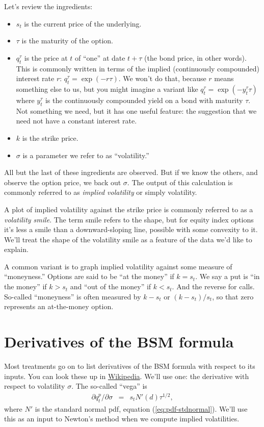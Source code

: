 \documentclass[11pt]{article}
\begin{document}
Let's review the ingredients:
\begin{itemize}
\item $s_t$ is the current price of the underlying.
\item $\tau$ is the maturity of the option.
\item $q_t^\tau$ is the price at $t$ of ``one'' at date $t+\tau$  (the bond price, in other words).
This is commonly written in terms of the implied (continuously compounded) interest rate $r$:
$q_t^\tau = \exp(-r \tau)$.
We won't do that, because $r$ means something else to us, but you might imagine
a variant like $q_t^\tau = \exp(-y_t^\tau \tau)$
where $y_t^\tau$ is the continuously compounded yield on a bond with maturity $\tau$.
Not something we need, but it has one useful feature:
the suggestion that we need not have a constant interest rate.
\item $k$ is the strike price.
\item $\sigma$ is a parameter we refer to as ``volatility.''
\end{itemize}
All but the last of these ingredients are observed.
But if we know the others,
and observe the option price, we back out $\sigma$.
The output of this calculation is commonly referred to as {\it implied volatility\/}
or simply volatility.


A plot of implied volatility against the strike price
is commonly referred to as a {\it volatility smile\/}.
The term smile refers to the shape, but for equity index options
it's less a smile than a downward-sloping line, possible with some
convexity to it.
We'll treat the shape of the volatility smile as a feature of the data we'd like
to explain.

A common variant is to graph implied volatility against
some measure of ``moneyness.''
Options are said to be ``at the money'' if $ k = s_t$.
We say a put is ``in the money'' if $k > s_t $ and ``out of the money''
if $ k< s_t $.
And the reverse for calls.
So-called ``moneyness'' is often measured by $ k-s_t$ or $(k-s_t)/s_t$,
so that zero represents an at-the-money option.

\section{Derivatives of the BSM formula}

Most treatments go on to list derivatives of the BSM formula
with respect to its inputs.
You can look these up in
\href{http://en.wikipedia.org/wiki/Black-Scholes_model#The_Greeks}{Wikipedia}.
We'll use one:  the derivative with respect to volatility $\sigma$.
The so-called ``vega'' is
\begin{eqnarray*}
    \partial q^p_t /\partial \sigma &=&
            s_t N'(d) \tau^{1/2} ,
\end{eqnarray*}
where $N'$ is the standard normal pdf, equation (\ref{eq:pdf-stdnormal}).
We'll use this as an input to Newton's method when we compute
implied volatilities.
\end{document}
